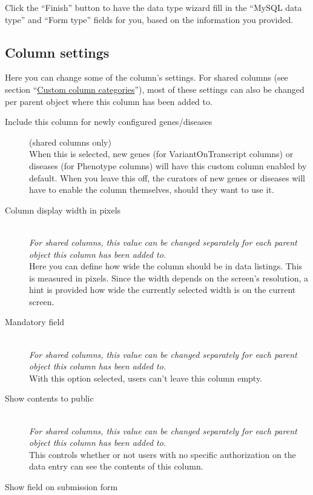\documentclass[a4paper,oneside,openany,12pt]{memoir}
\begin{document}
\noindent
Click the ``Finish'' button to have the data type wizard fill in the ``MySQL data type'' and ``Form type'' fields for you,
 based on the information you provided.



\subsection{Column settings}
Here you can change some of the column's settings.
For shared columns (see section ``\hyperlink{sec:custom_column_categories}{Custom column categories}''),
 most of these settings can also be changed per parent object where this column has been added to.
\begin{description}
  \item[Include this column for newly configured genes/diseases] (shared columns only)\hfill \\
  When this is selected, new genes (for VariantOnTranscript columns) or diseases (for Phenotype columns) will have this custom column enabled by default.
  When you leave this off, the curators of new genes or diseases will have to enable the column themselves, should they want to use it.
  \item[Column display width in pixels] \hfill \\
  \emph{For shared columns, this value can be changed separately for each parent object this column has been added to.}
  \\
  Here you can define how wide the column should be in data listings.
  This is measured in pixels.
  Since the width depends on the screen's resolution, a hint is provided how wide the currently selected width is on the current screen.
  \item[Mandatory field] \hfill \\
  \emph{For shared columns, this value can be changed separately for each parent object this column has been added to.}
  \\
  With this option selected, users can't leave this column empty.
  \item[Show contents to public] \hfill \\
  \emph{For shared columns, this value can be changed separately for each parent object this column has been added to.}
  \\
  This controls whether or not users with no specific authorization on the data entry can see the contents of this column.
  \item[Show field on submission form] \hfill \\

\end{description}
\end{document}

